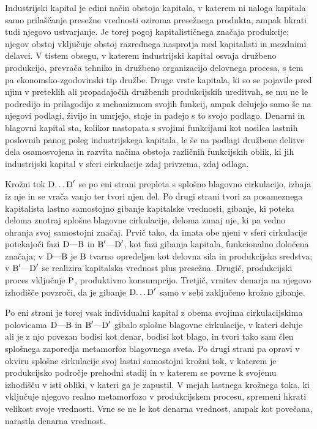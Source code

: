 \documentclass[kapital_02.tex]{subfiles}
\begin{document}
Industrijski kapital je edini način obstoja kapitala, v katerem ni naloga kapitala samo prilaščanje presežne vrednosti oziroma presežnega produkta, ampak hkrati tudi njegovo ustvarjanje. Je torej pogoj kapitalističnega značaja produkcije; njegov obstoj vključuje obstoj razrednega nasprotja med kapitalisti in mezdnimi delavci. V tistem obsegu, v katerem industrijski kapital osvaja družbeno produkcijo, prevrača tehniko in družbeno organizacijo delovnega procesa, s tem pa ekonomsko-zgodovinski tip družbe. Druge vrste kapitala, ki so se pojavile pred njim v preteklih ali propadajočih družbenih produkcijskih ureditvah, se mu ne le podredijo in prilagodijo z mehanizmom svojih funkcij, ampak delujejo samo še na njegovi podlagi, živijo in umrjejo, stoje in padejo s to svojo podlago. Denarni in blagovni kapital sta, kolikor nastopata s svojimi funkcijami kot nosilca lastnih poslovnih panog poleg industrijskega kapitala, le še na podlagi družbene delitve dela osamosvojena in razvita načina obstoja različnih funkcijskih oblik, ki jih industrijski kapital v sferi cirkulacije zdaj privzema, zdaj odlaga.

Krožni tok \( \textrm{D}\textrm{\dots}\textrm{D}' \) se po eni strani prepleta s splošno blagovno cirkulacijo, izhaja iz nje in se vrača vanjo ter tvori njen del. Po drugi strani tvori za posameznega kapitalista lastno samostojno gibanje kapitalske vrednosti, gibanje, ki poteka deloma znotraj splošne blagovne cirkulacije, deloma zunaj nje, ki pa vedno ohranja svoj samostojni značaj. Prvič tako, da imata obe njeni v sferi cirkulacije potekajoči fazi \( \textrm{D}\textrm{---}\textrm{B} \) in \( \textrm{B}'\textrm{---}\textrm{D}' \), kot fazi gibanja kapitala, funkcionalno določena značaja; v \( \textrm{D}\textrm{---}\textrm{B} \) je \( \textrm{B} \) tvarno opredeljen kot delovna sila in produkcijska sredstva; v \( \textrm{B}'\textrm{---}\textrm{D}' \) se realizira kapitalska vrednost plus presežna. Drugič, produkcijski proces vključuje \( \textrm{P} \), produktivno konsumpcijo. Tretjič, vrnitev denarja na njegovo izhodišče povzroči, da je gibanje \( \textrm{D}\textrm{\dots}\textrm{D}' \) samo v sebi zaključeno krožno gibanje.

Po eni strani je torej vsak individualni kapital z obema svojima cirkulacijskima polovicama \( \textrm{D}\textrm{---}\textrm{B} \) in \( \textrm{B}'\textrm{---}\textrm{D}' \) gibalo splošne blagovne cirkulacije, v kateri deluje ali je z njo povezan bodisi kot denar, bodisi kot blago, in tvori tako sam člen splošnega zaporedja metamorfoz blagovnega sveta. Po drugi strani pa opravi v okviru splošne cirkulacije svoj lastni samostojni krožni tok, v katerem je produkcijsko področje prehodni stadij in v katerem se povrne k svojemu izhodišču v isti obliki, v kateri ga je zapustil. V mejah lastnega krožnega toka, ki vključuje njegovo realno metamorfozo v produkcijskem procesu, spremeni hkrati velikost svoje vrednosti. Vrne se ne le kot denarna vrednost, ampak kot povečana, narastla denarna vrednost.
\end{document}
